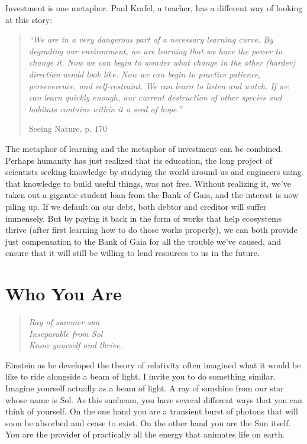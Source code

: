 \documentclass[ebook,11pt,openany,twoside,showtrims]{memoir}
\newcommand{\tab}{\hspace*{2em}}
\newcommand{\imagefacingchapter}[1]{
  \cleartoverso
  \clearpage \null
  \thispagestyle{cleared}
  \AddToShipoutPictureBG*{%
    \AtStockLowerLeft{%
      \texttt{[image: \#1]}
    }
  }
  \clearpage
}
\begin{document}
Investment is one metaphor. Paul Krafel, a teacher, has a different way of
looking at this story:

\begin{quote}
	\em
	``We are in a very dangerous part of a necessary learning curve. By
degrading our environment, we are learning that we have the power to change it.
Now we can begin to wonder what change in the other (harder) direction would
look like. Now we can begin to practice patience, perseverence, and
self-restraint. We can learn to listen and watch. If we can learn quickly
enough, our current destruction of other species and habitats contains within
it a seed of hope.''

\tab \tab Seeing Nature, p. 170
\end{quote}

The metaphor of learning and the metaphor of investment can be combined.
Perhaps humanity has just realized that its education, the long project of
scientists seeking knowledge by studying the world around us and engineers
using that knowledge to build useful things, was not free. Without realizing
it, we've taken out a gigantic student loan from the Bank of Gaia, and the
interest is now piling up. If we default on our debt, both debtor and creditor
will suffer immensely. But by paying it back in the form of works that help
ecosystems thrive (after first learning how to do those works properly), we can
both provide just compensation to the Bank of Gaia for all the trouble we've
caused, and ensure that it will still be willing to lend resources to us in the
future.

\imagefacingchapter{images/RayOfSummerSun-cropped}
\chapter{Who You Are}

\begin{verse}
\em
Ray of summer sun\\
Inseparable from Sol\\
Know yourself and thrive.
\end{verse}

Einstein as he developed the theory of relativity often imagined what it would
be like to ride alongside a beam of light. I invite you to do something
similar. Imagine yourself actually as a beam of light. A ray of sunshine from
our star whose name is Sol. As this sunbeam, you have several different ways
that you can think of yourself. On the one hand you are a transient burst of
photons that will soon be absorbed and cease to exist. On the other hand you
are the Sun itself. You are the provider of practically all the energy that
animates life on earth.
\end{document}
